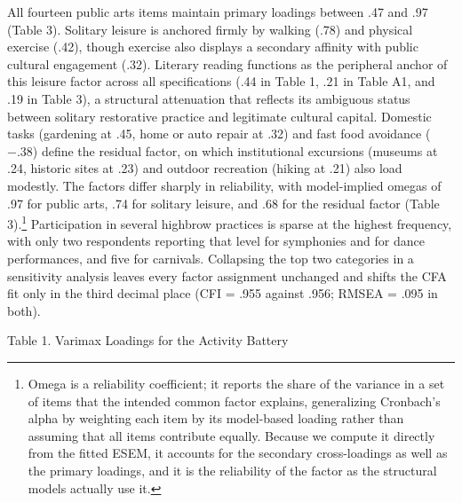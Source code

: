 \documentclass[
  12pt
]{article}
\begin{document}
All fourteen public arts items maintain primary loadings between .47 and .97 (Table 3). Solitary leisure is anchored firmly by walking (.78) and physical exercise (.42), though exercise also displays a secondary affinity with public cultural engagement (.32). Literary reading functions as the peripheral anchor of this leisure factor across all specifications (.44 in Table 1, .21 in Table A1, and .19 in Table 3), a structural attenuation that reflects its ambiguous status between solitary restorative practice and legitimate cultural capital. Domestic tasks (gardening at .45, home or auto repair at .32) and fast food avoidance ($-.38$) define the residual factor, on which institutional excursions (museums at .24, historic sites at .23) and outdoor recreation (hiking at .21) also load modestly. The factors differ sharply in reliability, with model-implied omegas of .97 for public arts, .74 for solitary leisure, and .68 for the residual factor (Table 3).\footnote{Omega is a reliability coefficient; it reports the share of the variance in a set of items that the intended common factor explains, generalizing Cronbach's alpha by weighting each item by its model-based loading rather than assuming that all items contribute equally. Because we compute it directly from the fitted ESEM, it accounts for the secondary cross-loadings as well as the primary loadings, and it is the reliability of the factor as the structural models actually use it.} Participation in several highbrow practices is sparse at the highest frequency, with only two respondents reporting that level for symphonies and for dance performances, and five for carnivals. Collapsing the top two categories in a sensitivity analysis leaves every factor assignment unchanged and shifts the CFA fit only in the third decimal place (CFI = .955 against .956; RMSEA = .095 in both).


Table 1. Varimax Loadings for the Activity Battery
\end{document}
